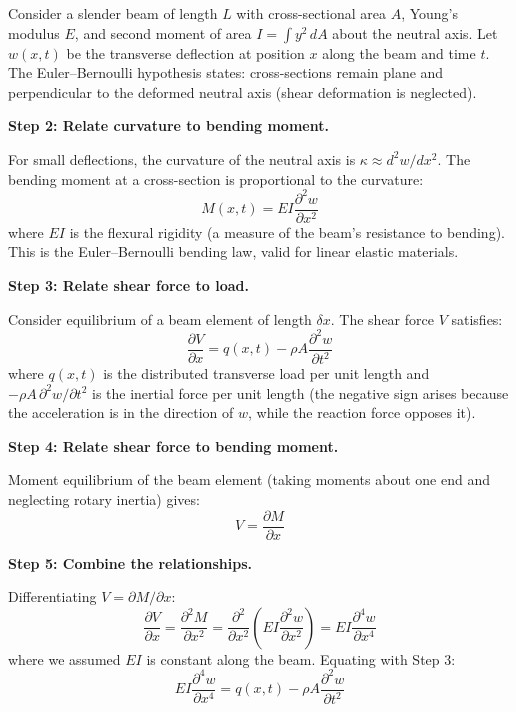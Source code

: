 Consider a slender beam of length $L$ with cross-sectional area $A$, Young's modulus $E$, and second moment of area $I = \int y^2\,dA$ about the neutral axis. Let $w(x,t)$ be the transverse deflection at position $x$ along the beam and time $t$. The Euler--Bernoulli hypothesis states: cross-sections remain plane and perpendicular to the deformed neutral axis (shear deformation is neglected).

\textbf{Step 2: Relate curvature to bending moment.}

For small deflections, the curvature of the neutral axis is $\kappa \approx d^2w/dx^2$. The bending moment at a cross-section is proportional to the curvature:
\begin{equation}
M(x,t) = EI\frac{\partial^2 w}{\partial x^2}
\end{equation}
where $EI$ is the flexural rigidity (a measure of the beam's resistance to bending). This is the Euler--Bernoulli bending law, valid for linear elastic materials.

\textbf{Step 3: Relate shear force to load.}

Consider equilibrium of a beam element of length $\delta x$. The shear force $V$ satisfies:
\begin{equation}
\frac{\partial V}{\partial x} = q(x,t) - \rho A\frac{\partial^2 w}{\partial t^2}
\end{equation}
where $q(x,t)$ is the distributed transverse load per unit length and $-\rho A\,\partial^2 w/\partial t^2$ is the inertial force per unit length (the negative sign arises because the acceleration is in the direction of $w$, while the reaction force opposes it).

\textbf{Step 4: Relate shear force to bending moment.}

Moment equilibrium of the beam element (taking moments about one end and neglecting rotary inertia) gives:
\begin{equation}
V = \frac{\partial M}{\partial x}
\end{equation}

\textbf{Step 5: Combine the relationships.}

Differentiating $V = \partial M/\partial x$:
\begin{equation}
\frac{\partial V}{\partial x} = \frac{\partial^2 M}{\partial x^2} = \frac{\partial^2}{\partial x^2}\left(EI\frac{\partial^2 w}{\partial x^2}\right) = EI\frac{\partial^4 w}{\partial x^4}
\end{equation}
where we assumed $EI$ is constant along the beam. Equating with Step 3:
\begin{equation}
EI\frac{\partial^4 w}{\partial x^4} = q(x,t) - \rho A\frac{\partial^2 w}{\partial t^2}
\end{equation}

